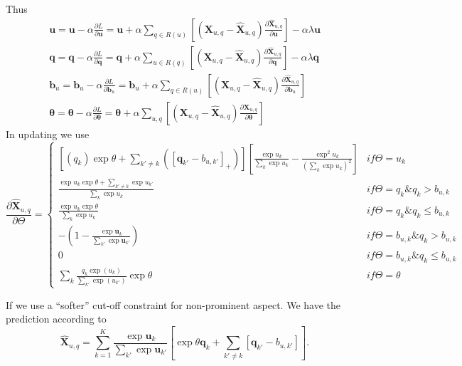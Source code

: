 \documentclass[11pt]{report}
\begin{document}
Thus \begin{eqnarray}
 \mathbf{u}= \mathbf{u} - \alpha \frac{\partial L}{\partial \mathbf{u}} =  \mathbf{u} +  \alpha \sum_{q\in R(u)}[ (\mathbf{X}_{u,q}- \hat{\mathbf{X}}_{u,q})\frac{\partial \hat{\mathbf{X}}_{u,q}}{\partial \mathbf{u}}] - \alpha\lambda \mathbf{u} \\\nonumber
 \mathbf{q} =  \mathbf{q} - \alpha \frac{\partial L}{\partial \mathbf{q}}=  \mathbf{q} +  \alpha \sum_{u\in R(q)}[ (\mathbf{X}_{u,q}- \hat{\mathbf{X}}_{u,q})\frac{\partial \hat{\mathbf{X}}_{u,q}}{\partial \mathbf{q}}] - \alpha\lambda \mathbf{q} \\\nonumber
 \mathbf{b}_{u} =  \mathbf{b}_{u} - \alpha \frac{\partial L}{\partial \mathbf{b}_{u}}=  \mathbf{b}_{u} +  \alpha \sum_{q\in R(u)}[ (\mathbf{X}_{u,q}- \hat{\mathbf{X}}_{u,q})\frac{\partial \hat{\mathbf{X}}_{u,q}}{\partial \mathbf{b}_u}]  \\\nonumber
\mathbf{\theta} =  \mathbf{\theta} - \alpha \frac{\partial L}{\partial \mathbf{\theta}}=  \mathbf{\theta} +  \alpha \sum_{u,q}[ (\mathbf{X}_{u,q}- \hat{\mathbf{X}}_{u,q})\frac{\partial \hat{\mathbf{X}}_{u,q}}{\partial \mathbf{\theta}}] 
\end{eqnarray}
In updating we use
 \begin{equation}\label{equ:derivative}
 \frac{\partial \hat{\mathbf{X}}_{u,q}}{\partial \Theta}=\left\{\begin{matrix}
 [(q_k) \exp\theta +\sum_{k'\neq k}([\mathbf{q}_{k'}-b_{u,k'}]_+)][\frac{\exp u_k}{\sum_{k}\exp u_k}-\frac{\exp^2 u_k}{(\sum_k \exp u_k)^2}] & if \Theta=u_k \\ 
\frac{\exp u_k \exp \theta +\sum_{k'\neq k} \exp u_{k'}}{\sum_k \exp u_k}  & if \Theta= q_{k} \& q_{k} > b_{u,k} \\ 
\frac{\exp u_k \exp \theta }{\sum_k \exp u_k}  & if \Theta= q_{k} \& q_{k} \leq b_{u,k} \\ 
-(1-\frac{\exp\mathbf{u}_k}{\sum_{k'}\exp\mathbf{u}_{k'}}) & if \Theta = b_{u,k} \& q_k > b_{u,k} \\
0 & if \Theta = b_{u,k} \& q_k \leq b_{u,k} \\
\sum_k  \frac{q_k \exp (u_k)}{\sum_{k'} \exp (u_{k'})} \exp \theta & if \Theta = \theta 
\end{matrix}\right.
\end{equation}

If we use a ``softer'' cut-off constraint for  non-prominent aspect. We have the prediction according to 
\begin{equation}\label{equ:MF-NCR}
 \hat{\mathbf{X}}_{u,q}=\sum_{k=1}^{K} \frac{\exp \mathbf{u}_k}{\sum_{k'} \exp \mathbf{u}_{k'}} [ \exp\theta \mathbf{q}_k  + \sum_{k'\neq k} [\mathbf{q}_{k'}-b_{u,k'}] ].
\end{equation}
\end{document}
